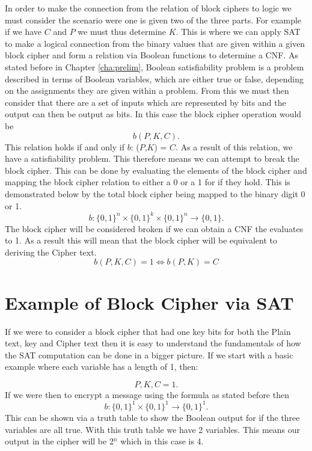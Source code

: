 \documentclass[11pt,a4paper, notitlepage]{report}
\begin{document}
In order to make the connection from the relation of block ciphers to logic we must consider the scenario were one is given two of the three parts. For example if we have $C$ and $P$ we must thus determine $K$. This is where we can apply SAT to make a logical connection from the binary values that are given within a given block cipher and form a relation via Boolean functions to determine a CNF.
As stated before in Chapter \ref{cha:prelim}, Boolean satisfiability problem is a problem described in terms of Boolean variables, which are either true or false, depending on the assignments they are given within a problem. From this we must then consider that there are a set of inputs which are represented by bits and the output can then be output as bits. In this case the block cipher operation would be
\begin{displaymath}
b(P,K,C).
\end{displaymath}
This relation holds if and only if $b$: ($P$,$K$) = $C$. As a result of this relation, we have a satisfiability problem. This therefore means we can attempt to break the block cipher. This can be done by evaluating the elements of the block cipher and mapping the block cipher relation to either a 0 or a 1 for if they hold. This is demonstrated below by the total block cipher being mapped to the binary digit 0 or 1. 
\begin{displaymath}
b:  \{0,1\}^n \times \{0,1\}^k \times \{0,1\}^n \rightarrow \{0,1\}.
\end{displaymath}
The block cipher will be considered broken if we can obtain a CNF the evaluates to 1. As a result this will mean that the block cipher will be equivalent to deriving the Cipher text. 
\begin{displaymath}
b(P,K,C) = 1 \Leftrightarrow b(P,K) = C
\end{displaymath}




\section{Example of Block Cipher via SAT}
\label{sec:examplebcsat}

If we were to consider a block cipher that had one key bits for both the Plain text, key and Cipher text then it is easy to understand the fundamentals of how the SAT computation can be done in a bigger picture. If we start with a basic example where each variable has a length of 1, then:

\begin{displaymath}
P, K, C = 1.
\end{displaymath}
If we were then to encrypt a message using the formula as stated before then
\begin{displaymath}
b: \{0,1\}^{1} \times \{0,1\}^1 \rightarrow \{0,1\}^1.
\end{displaymath}
This can be shown via a truth table to show the Boolean output for if the three variables are all true. With this truth table we have 2 variables. This means our output in the cipher will be 2$^{n}$ which in this case is 4.
\end{document}

